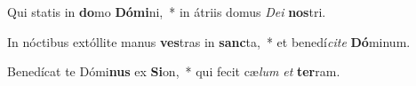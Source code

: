 \item Qui statis in \textbf{do}mo \textbf{Dó}\textbf{mi}ni,~* in átriis domus \textit{De}\textit{i} \textbf{nos}tri.
\item In nóctibus extóllite manus \textbf{ves}tras in \textbf{sanc}ta,~* et benedí\textit{ci}\textit{te} \textbf{Dó}minum.
\item Benedícat te Dómi\textbf{nus} ex \textbf{Si}on,~* qui fecit cæ\textit{lum} \textit{et} \textbf{ter}ram.
